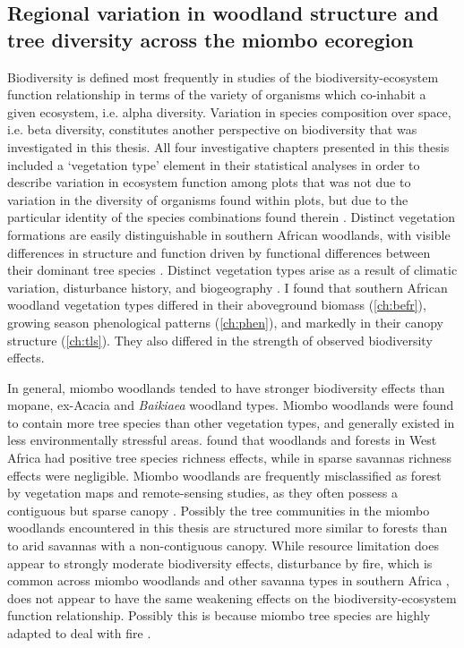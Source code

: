 \begin{refsection}
\subsection{Regional variation in woodland structure and tree diversity across the miombo ecoregion}
\label{discussion:ssec:veg_type}

Biodiversity is defined most frequently in studies of the biodiversity-ecosystem function relationship in terms of the variety of organisms which co-inhabit a given ecosystem, i.e. alpha diversity. Variation in species composition over space, i.e. beta diversity, constitutes another perspective on biodiversity that was investigated in this thesis. All four investigative chapters presented in this thesis included a `vegetation type' element in their statistical analyses in order to describe variation in ecosystem function among plots that was not due to variation in the diversity of organisms found within plots, but due to the particular identity of the species combinations found therein \citep{Grime1998}. Distinct vegetation formations are easily distinguishable in southern African woodlands, with visible differences in structure and function driven by functional differences between their dominant tree species \citep{Solbrig1996}. Distinct vegetation types arise as a result of climatic variation, disturbance history, and biogeography \citep{Fayolle2018}. I found that southern African woodland vegetation types differed in their aboveground biomass (\autoref{ch:befr}), growing season phenological patterns (\autoref{ch:phen}), and markedly in their canopy structure (\autoref{ch:tls}). They also differed in the strength of observed biodiversity effects. 

In general, miombo woodlands tended to have stronger biodiversity effects than mopane, ex-Acacia and \textit{Baikiaea} woodland types. Miombo woodlands were found to contain more tree species than other vegetation types, and generally existed in less environmentally stressful areas. \citet{Mensah2020} found that woodlands and forests in West Africa had positive tree species richness effects, while in sparse savannas richness effects were negligible. Miombo woodlands are frequently misclassified as forest by vegetation maps and remote-sensing studies, as they often possess a contiguous but sparse canopy \citep{Solbrig1996}. Possibly the tree communities in the miombo woodlands encountered in this thesis are structured more similar to forests than to arid savannas with a non-contiguous canopy. While resource limitation does appear to strongly moderate biodiversity effects, disturbance by fire, which is common across miombo woodlands and other savanna types in southern Africa \citep{Saito2014}, does not appear to have the same weakening effects on the biodiversity-ecosystem function relationship. Possibly this is because miombo tree species are highly adapted to deal with fire \citep{Dantas2013}. 


\end{refsection}
